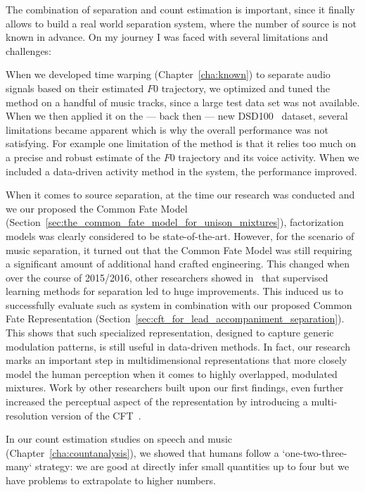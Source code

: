 The combination of separation and count estimation is important, since it finally allows to build a real world separation system, where the number of source is not known in advance.
On my journey I was faced with several limitations and challenges:
\par
When we developed time warping (Chapter~\ref{cha:known}) to separate audio signals based on their estimated \(F0\) trajectory, we optimized and tuned the method on a handful of music tracks, since a large test data set was not available. When we then applied it on the --- back then --- new DSD100~\cite{liutkus17} dataset, several limitations became apparent which is why the overall performance was not satisfying. For example one limitation of the method is that it relies too much on a precise and robust estimate of the \(F0\) trajectory and its voice activity. When we included a data-driven activity method in the system, the performance improved.
\par
When it comes to source separation, at the time our research was conducted and we  our proposed the Common Fate Model (Section~\ref{sec:the_common_fate_model_for_unison_mixtures}), factorization models was clearly considered to be state-of-the-art.
However, for the scenario of music separation, it turned out that the Common Fate Model was still requiring a significant amount of additional hand crafted engineering.
This changed when over the course of 2015/2016, other researchers showed in~\cite{uhlich15, nugraha162} that supervised learning methods for separation led to huge improvements. This induced us to successfully evaluate such as system in combination with our proposed Common Fate Representation (Section~\ref{sec:cft_for_lead_accompaniment_separation}).
This shows that such specialized representation, designed to capture generic modulation patterns, is still useful in data-driven methods.
In fact, our research marks an important step in multidimensional representations that more closely model the human perception when it comes to highly overlapped, modulated mixtures. Work by other researchers built upon our first findings, even further increased the perceptual aspect of the representation by introducing a multi-resolution version of the CFT~\cite{seetharaman17, pishdadian18}.
\par
In our count estimation studies on speech and music (Chapter~\ref{cha:countanalysis}), we showed that humans follow a `one-two-three-many` strategy: we are good at directly infer small quantities up to four but we have problems to extrapolate to higher numbers.
